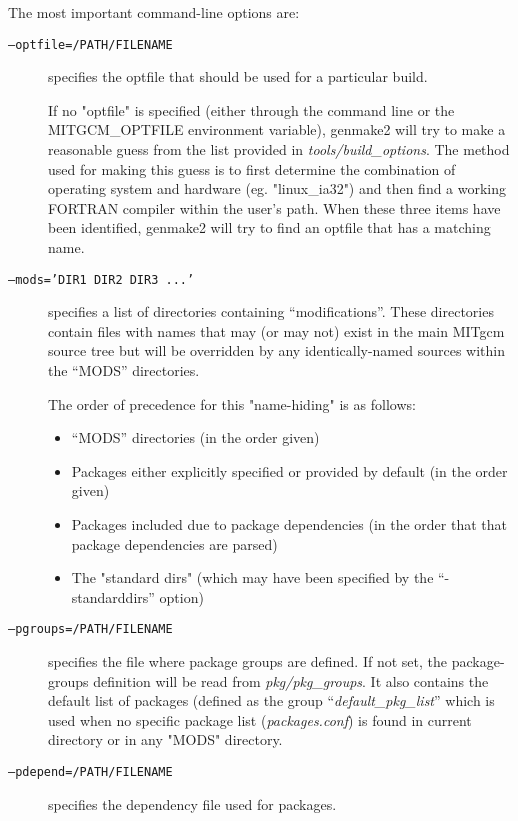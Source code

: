 The most important command-line options are:
\begin{description}
  
\item[\texttt{--optfile=/PATH/FILENAME}] specifies the optfile that
  should be used for a particular build.
  
  If no "optfile" is specified (either through the command line or the
  MITGCM\_OPTFILE environment variable), genmake2 will try to make a
  reasonable guess from the list provided in {\em
    tools/build\_options}.  The method used for making this guess is
  to first determine the combination of operating system and hardware
  (eg. "linux\_ia32") and then find a working FORTRAN compiler within
  the user's path.  When these three items have been identified,
  genmake2 will try to find an optfile that has a matching name.
  
\item[\texttt{--mods='DIR1 DIR2 DIR3 ...'}] specifies a list of
  directories containing ``modifications''.  These directories contain
  files with names that may (or may not) exist in the main MITgcm
  source tree but will be overridden by any identically-named sources
  within the ``MODS'' directories.
  
  The order of precedence for this "name-hiding" is as follows:
  \begin{itemize}
  \item ``MODS'' directories (in the order given)
  \item Packages either explicitly specified or provided by default
    (in the order given)
  \item Packages included due to package dependencies (in the order
    that that package dependencies are parsed)
  \item The "standard dirs" (which may have been specified by the
    ``-standarddirs'' option)
  \end{itemize}
  
\item[\texttt{--pgroups=/PATH/FILENAME}] specifies the file
  where package groups are defined. If not set, the package-groups 
  definition will be read from {\em pkg/pkg\_groups}.
  It also contains the default list of packages (defined
  as the group ``{\it default\_pkg\_list}'' which is used
  when no specific package list ({\em packages.conf})
  is found in current directory or in any "MODS" directory.

\item[\texttt{--pdepend=/PATH/FILENAME}] specifies the dependency file
  used for packages.
  

\end{description}
